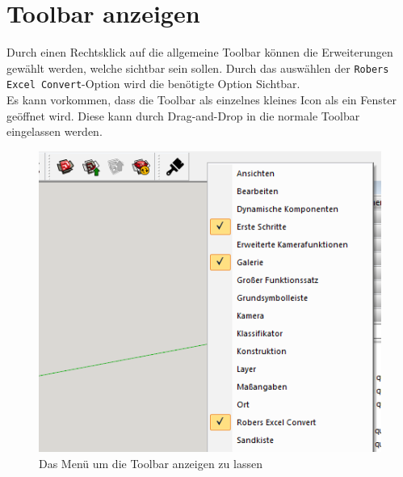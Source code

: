 \documentclass{book}
\begin{document}
		\section{Toolbar anzeigen}
			Durch einen Rechtsklick auf die allgemeine Toolbar können die Erweiterungen gewählt werden, welche sichtbar sein sollen. Durch das auswählen der \texttt{Robers Excel Convert}-Option wird die benötigte Option Sichtbar. \\
			Es kann vorkommen, dass die Toolbar als einzelnes kleines Icon als ein Fenster geöffnet wird. Diese kann durch Drag-and-Drop in die normale Toolbar eingelassen werden.
			\begin{figure}[H]
				\centering
				\includegraphics[scale=0.4]{pics/toolbar.png}
				\caption{Das Menü um die Toolbar anzeigen zu lassen}
				\label{toolbar}
			\end{figure}
\end{document}
